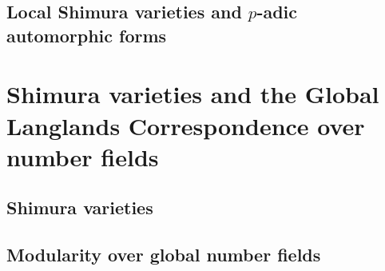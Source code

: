             
            
        \chapter{Local Shimura varieties and \texorpdfstring{$p$}{}-adic automorphic forms}
            \begin{abstract}
                
            \end{abstract}
            
            \minitoc
    
    \part{Shimura varieties and the Global Langlands Correspondence over number fields}
        \chapter{Shimura varieties}
            \begin{abstract}
                
            \end{abstract}
            
            \minitoc
            
            
            
            
            
            
            
        \chapter{Modularity over global number fields}
            \begin{abstract}
                
            \end{abstract}
            
            \minitoc
            

